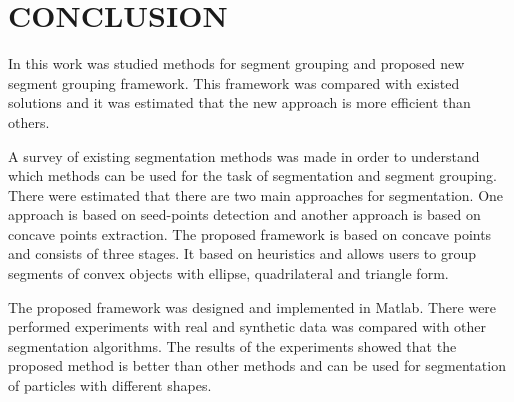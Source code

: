 \documentclass{lutmscthesis}[2010/09/22]
\begin{document}
\section{CONCLUSION}
\label{sec:conclusion}

In this work was studied methods for segment grouping and proposed new segment grouping framework. This framework was compared with existed solutions and it was estimated that the new approach is more efficient than others.

A survey of existing segmentation methods was made in order to understand which methods can be used for the task of segmentation and segment grouping. There were estimated that there are two main approaches for segmentation. One approach is based on seed-points detection and another approach is based on concave points extraction. The proposed framework is based on concave points and consists of three stages. It based on heuristics and allows users to group segments of convex objects with ellipse, quadrilateral and triangle form. 

The proposed framework was designed and implemented in Matlab. There were performed experiments with real and synthetic data was compared with other segmentation algorithms. The results of the experiments showed that the proposed method is better than other methods and can be used for segmentation of particles with different shapes.

\clearpage

%





 

%
\end{document}

